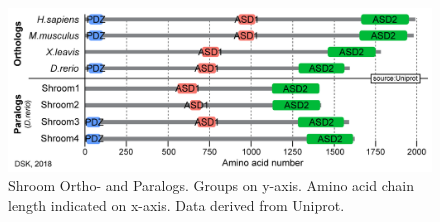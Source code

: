 \documentclass[10pt, b5paper, singlespacinge, twoside]{reedthesis} %
\theoremstyle{definition}
\theoremstyle{definition}
\theoremstyle{definition}
\theoremstyle{remark}
\begin{document}
\begin{figure}[H]

{\centering \includegraphics[width=0.85\linewidth]{figures/supp/Shroom3_orthology-01} 

}

\caption[Shroom Ortho- and Paralogs]{Shroom Ortho- and Paralogs. Groups on y-axis. Amino acid chain length indicated on x-axis. Data derived from Uniprot.}\label{fig:suppshrmort}
\end{figure}
\end{document}
